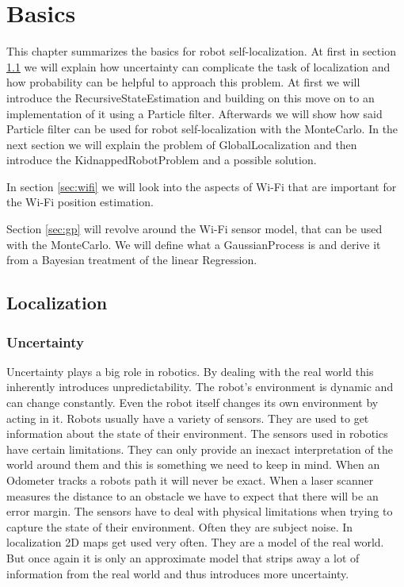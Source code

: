 \chapter{Basics} %
\label{Chapter2}

This chapter summarizes the basics for robot self-localization. At first in section \ref{sec:localization} we will explain how uncertainty can complicate the task of localization and how probability can be helpful to approach this problem. At first we will introduce the \gls{RecursiveStateEstimation} and building on this move on to an implementation of it using a \gls{Particle} filter. Afterwards we will show how said \gls{Particle} filter can be used for robot self-localization with the \Gls{MonteCarlo}. In the next section we will explain the problem of \gls{GlobalLocalization} and then introduce the \gls{KidnappedRobotProblem} and a possible solution.

In section \ref{sec:wifi} we will look into the aspects of Wi-Fi that are important for the Wi-Fi position estimation.

Section \ref{sec:gp} will revolve around the Wi-Fi sensor model, that can be used with the \Gls{MonteCarlo}. We will define what a \Gls{GaussianProcess} is and derive it from a Bayesian treatment of the linear \gls{Regression}. 

\section{Localization} \label{sec:localization}
\subsection{Uncertainty}
Uncertainty plays a big role in robotics. By dealing with the real world this inherently introduces unpredictability. The robot's environment is dynamic and can change constantly. Even the robot itself changes its own environment by acting in it. Robots usually have a variety of sensors. They are used to get information about the state of their environment. The sensors used in robotics have certain limitations. They can only provide an inexact interpretation of the world around them and this is something we need to keep in mind. When an \gls{Odometer} tracks a robots path it will never be exact. When a laser scanner measures the distance to an obstacle we have to expect that there will be an error margin. The sensors have to deal with physical limitations when trying to capture the state of their environment. Often they are subject noise. In localization 2D maps get used very often. They are a model of the real world. But once again it is only an approximate model that strips away a lot of information from the real world and thus introduces more uncertainty\citep[p. 3-4]{Thrun:2005:PR:1121596}.

